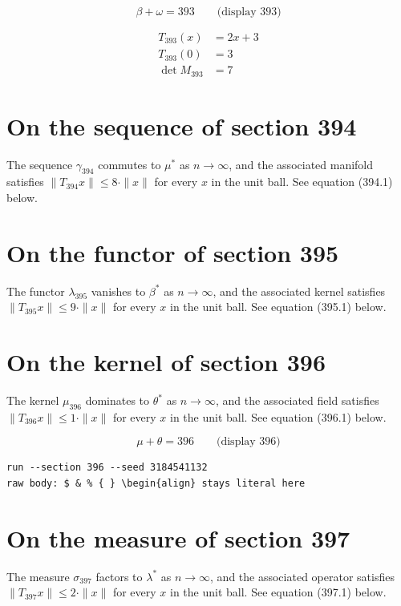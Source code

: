 \documentclass{article}
\begin{document}
$$
\beta + \omega = 393 \qquad \text{(display 393)}
$$

\begin{align}
T_{393}(x) &= 2 x + 3 \\
T_{393}(0) &= 3 \\
\det M_{393} &= 7
\end{align}

\section{On the sequence of section 394}
The sequence $\gamma_{394}$ commutes to $\mu^{*}$ as $n \to \infty$,
and the associated manifold satisfies $\|T_{394} x\| \leq 8 \cdot \|x\|$
for every $x$ in the unit ball. See equation (394.1) below.

\section{On the functor of section 395}
The functor $\lambda_{395}$ vanishes to $\beta^{*}$ as $n \to \infty$,
and the associated kernel satisfies $\|T_{395} x\| \leq 9 \cdot \|x\|$
for every $x$ in the unit ball. See equation (395.1) below.

\section{On the kernel of section 396}
The kernel $\mu_{396}$ dominates to $\theta^{*}$ as $n \to \infty$,
and the associated field satisfies $\|T_{396} x\| \leq 1 \cdot \|x\|$
for every $x$ in the unit ball. See equation (396.1) below.

$$
\mu + \theta = 396 \qquad \text{(display 396)}
$$

\begin{verbatim}
run --section 396 --seed 3184541132
raw body: $ & % { } \begin{align} stays literal here
\end{verbatim}

\section{On the measure of section 397}
The measure $\sigma_{397}$ factors to $\lambda^{*}$ as $n \to \infty$,
and the associated operator satisfies $\|T_{397} x\| \leq 2 \cdot \|x\|$
for every $x$ in the unit ball. See equation (397.1) below.
\end{document}
